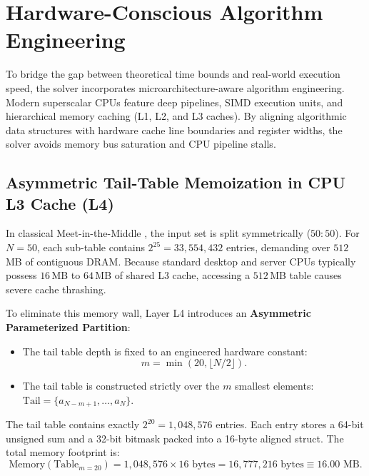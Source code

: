 \documentclass[journal,onecolumn,11pt]{IEEEtran}
\begin{document}
\section{Hardware-Conscious Algorithm Engineering}
\label{sec:hardware_engineering}

To bridge the gap between theoretical time bounds and real-world execution speed, the solver incorporates microarchitecture-aware algorithm engineering. Modern superscalar CPUs feature deep pipelines, SIMD execution units, and hierarchical memory caching (L1, L2, and L3 caches). By aligning algorithmic data structures with hardware cache line boundaries and register widths, the solver avoids memory bus saturation and CPU pipeline stalls.

\subsection{Asymmetric Tail-Table Memoization in CPU L3 Cache (L4)}
In classical Meet-in-the-Middle \cite{horowitz1974computing}, the input set is split symmetrically ($50:50$). For $N = 50$, each sub-table contains $2^{25} = 33{,}554{,}432$ entries, demanding over $512$\,MB of contiguous DRAM. Because standard desktop and server CPUs typically possess $16$\,MB to $64$\,MB of shared L3 cache, accessing a $512$\,MB table causes severe cache thrashing.

To eliminate this memory wall, Layer L4 introduces an \textbf{Asymmetric Parameterized Partition}:
\begin{itemize}
    \item The tail table depth is fixed to an engineered hardware constant:
    \begin{equation}
        m = \min(20, \lfloor N/2 \rfloor).
    \end{equation}
    \item The tail table is constructed strictly over the $m$ smallest elements: $\text{Tail} = \{a_{N-m+1}, \dots, a_N\}$.
\end{itemize}

The tail table contains exactly $2^{20} = 1{,}048{,}576$ entries. Each entry stores a 64-bit unsigned sum and a 32-bit bitmask packed into a 16-byte aligned struct. The total memory footprint is:
\begin{equation}
    \text{Memory}(\text{Table}_{m=20}) = 1{,}048{,}576 \times 16 \text{ bytes} = 16{,}777{,}216 \text{ bytes} \equiv 16.00 \text{ MB}.
\end{equation}
\end{document}
